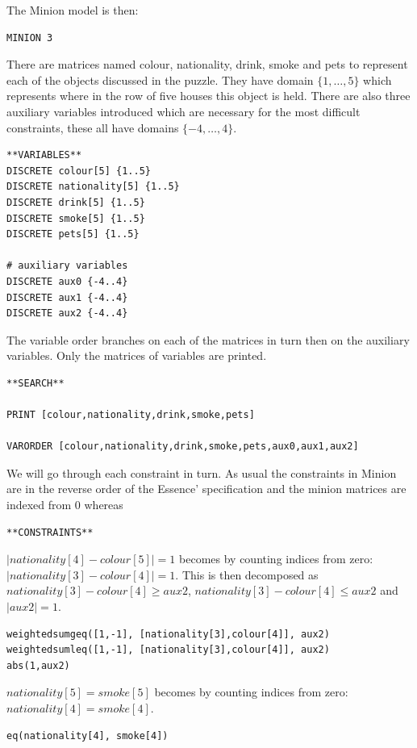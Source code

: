 \documentclass[oneside]{book}
\begin{document}
The Minion model is then: 

\begin{verbatim}
MINION 3
\end{verbatim}

There are matrices named colour, nationality, drink, smoke and pets to represent each of the objects discussed in the puzzle. They have domain $\{1,\ldots ,5\}$  which represents where in the row of five houses this object is held. There are also three auxiliary variables introduced which are necessary for the most difficult constraints, these all have domains $\{-4,\ldots ,4\}$.

\begin{verbatim}
**VARIABLES**
DISCRETE colour[5] {1..5}
DISCRETE nationality[5] {1..5}
DISCRETE drink[5] {1..5}
DISCRETE smoke[5] {1..5}
DISCRETE pets[5] {1..5}

# auxiliary variables
DISCRETE aux0 {-4..4}
DISCRETE aux1 {-4..4}
DISCRETE aux2 {-4..4}
\end{verbatim}

The variable order branches on each of the matrices in turn then on the auxiliary variables. Only the matrices of variables are printed.

\begin{verbatim}
**SEARCH**

PRINT [colour,nationality,drink,smoke,pets]

VARORDER [colour,nationality,drink,smoke,pets,aux0,aux1,aux2]
\end{verbatim}

We will go through each constraint in turn. As usual the constraints in Minion are in the reverse order of the Essence' specification and the minion matrices are indexed from 0 whereas 
\begin{verbatim}
**CONSTRAINTS**
\end{verbatim}

$|nationality[4] - colour[5]| = 1$ becomes by counting indices from zero: $|nationality[3] - colour[4]| = 1$. This is then decomposed as $nationality[3] - colour[4] \geq aux2$, $nationality[3] - colour[4] \leq aux2$ and $|aux2|=1$.
\begin{verbatim}
weightedsumgeq([1,-1], [nationality[3],colour[4]], aux2)
weightedsumleq([1,-1], [nationality[3],colour[4]], aux2)
abs(1,aux2)
\end{verbatim}

$nationality[5] = smoke[5]$ becomes by counting indices from zero: $nationality[4] = smoke[4]$.
\begin{verbatim}
eq(nationality[4], smoke[4])
\end{verbatim}
\end{document}

